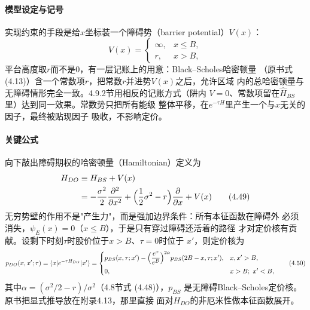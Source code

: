 \paragraph{模型设定与记号}
实现约束的手段是给$x$坐标装一个障碍势（barrier potential）$V(x)$：
\begin{equation*}
V(x)=
\begin{cases}
\infty, & x\leq B,\\
r, & x>B,
\end{cases}
\end{equation*}
平台高度取$r$而不是$0$，有一层记账上的用意：Black--Scholes哈密顿量
（原书式 (4.13)）含一个常数项$r$，把常数$r$并进势$V(x)$之后，允许区域
内的总哈密顿量与无障碍情形完全一致。4.9.2节用相反的记账方式（阱内
$V=0$、常数项留在$\hat{H}_{BS}$里）达到同一效果。常数势只把所有能级
整体平移，在$e^{-\tau H}$里产生一个与$x$无关的因子，最终被贴现因子
吸收，不影响定价。

\paragraph{关键公式}
向下敲出障碍期权的哈密顿量（Hamiltonian）定义为
\begin{align*}
H_{DO}&\equiv H_{BS}+V(x)\\
&=-\frac{\sigma^{2}}{2}\frac{\partial^{2}}{\partial x^{2}}
+\Bigl(\frac{1}{2}\sigma^{2}-r\Bigr)\frac{\partial}{\partial x}+V(x)
\tag{4.49}
\end{align*}
无穷势壁的作用不是"产生力"，而是强加边界条件：所有本征函数在障碍外
必须消失，$\psi_E(x)=0$（$x\leq B$），于是只有穿过障碍还活着的路径
才对定价核有贡献。设剩下时刻$\tau$时股价位于$x>B$、$\tau=0$时位于
$x'$，则定价核为
\begin{equation*}
p_{DO}(x,x';\tau)=\langle x\vert e^{-\tau H_{DO}}\vert x'\rangle
=\begin{cases}
p_{BS}(x,\tau;x')-\Bigl(\dfrac{e^{x}}{e^{B}}\Bigr)^{2\alpha}
p_{BS}(2B-x,\tau;x'), & x,x'>B,\\[6pt]
0, & x>B;\ x'<B,
\end{cases}
\tag{4.50}
\end{equation*}
其中$\alpha=(\sigma^{2}/2-r)/\sigma^{2}$（4.8节式 (4.48)），$p_{BS}$
是无障碍Black--Scholes定价核。原书把显式推导放在附录4.13，那里直接
面对$H_{DO}$的非厄米性做本征函数展开。

